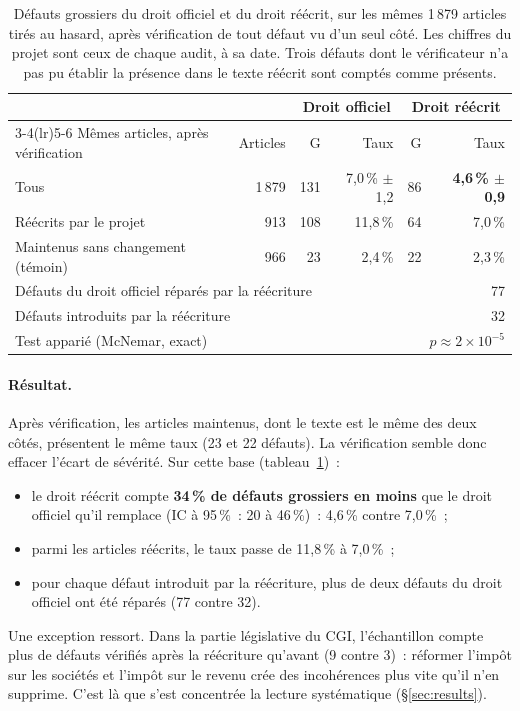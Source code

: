 \documentclass[11pt,a4paper]{article}
\begin{document}
\begin{table}[ht]
\centering
\small
\begin{tabular}{lrrrrr}
\toprule
& & \multicolumn{2}{c}{Droit officiel} & \multicolumn{2}{c}{Droit réécrit}\\
\cmidrule(lr){3-4}\cmidrule(lr){5-6}
Mêmes articles, après vérification & Articles & G & Taux & G & Taux\\
\midrule
Tous & 1\,879 & 131 & 7,0\,\% $\pm$ 1,2 & 86 & \textbf{4,6\,\% $\pm$ 0,9}\\
Réécrits par le projet & 913 & 108 & 11,8\,\% & 64 & 7,0\,\%\\
Maintenus sans changement (témoin) & 966 & 23 & 2,4\,\% & 22 & 2,3\,\%\\
\midrule
\multicolumn{4}{l}{Défauts du droit officiel réparés par la réécriture} & \multicolumn{2}{r}{77}\\
\multicolumn{4}{l}{Défauts introduits par la réécriture} & \multicolumn{2}{r}{32}\\
\multicolumn{4}{l}{Test apparié (McNemar, exact)} & \multicolumn{2}{r}{$p \approx 2\times10^{-5}$}\\
\bottomrule
\end{tabular}
\caption{Défauts grossiers du droit officiel et du droit réécrit, sur les mêmes 1\,879 articles tirés au hasard, après vérification de tout défaut vu d'un seul côté. Les chiffres du projet sont ceux de chaque audit, à sa date. Trois défauts dont le vérificateur n'a pas pu établir la présence dans le texte réécrit sont comptés comme présents.}
\label{tab:baseline}
\end{table}

\paragraph{Résultat.}
Après vérification, les articles maintenus, dont le texte est le même des deux côtés, présentent le même taux (23 et 22 défauts). La vérification semble donc effacer l'écart de sévérité. Sur cette base (tableau~\ref{tab:baseline})~:
\begin{itemize}
  \item le droit réécrit compte \textbf{34\,\% de défauts grossiers en moins} que le droit officiel qu'il remplace (IC à 95\,\%~: 20 à 46\,\%)~: 4,6\,\% contre 7,0\,\%~;
  \item parmi les articles réécrits, le taux passe de 11,8\,\% à 7,0\,\%~;
  \item pour chaque défaut introduit par la réécriture, plus de deux défauts du droit officiel ont été réparés (77 contre 32).
\end{itemize}
Une exception ressort. Dans la partie législative du CGI, l'échantillon compte plus de défauts vérifiés après la réécriture qu'avant (9 contre 3)~: réformer l'impôt sur les sociétés et l'impôt sur le revenu crée des incohérences plus vite qu'il n'en supprime. C'est là que s'est concentrée la lecture systématique (\S\ref{sec:results}).
\end{document}
